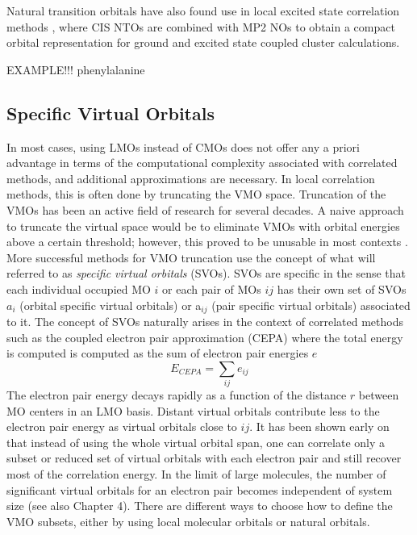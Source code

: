 Natural transition orbitals have also found use in local excited  state correlation methods \cite{Bau2017,Hof2017}, where CIS NTOs are combined with MP2 NOs to obtain a compact orbital representation for ground and excited state coupled cluster calculations.

EXAMPLE!!! phenylalanine






\subsection{Specific Virtual Orbitals}

In most cases, using LMOs instead of CMOs does not offer any a priori advantage in terms of the computational complexity associated with correlated methods, and additional approximations are necessary. In local correlation methods, this is often done by truncating the VMO space. Truncation of the VMOs has been an active field of research for several decades. A naive approach to truncate the virtual space would be to eliminate VMOs with orbital energies above a certain threshold; however, this proved to be unusable in most contexts \cite{Sen2011}. More successful methods for VMO truncation use the concept of what will referred to as \emph{specific virtual orbitals} (SVOs). SVOs are specific in the sense that each individual occupied MO $i$ or each pair of MOs $ij$ has their own set of SVOs $a_i$ (orbital specific virtual orbitals) or a$_{ij}$ (pair specific virtual orbitals) associated to it.
The concept of SVOs naturally arises in the context of correlated methods such as the coupled electron pair approximation (CEPA) where the total energy is computed is computed as the sum of electron pair energies $e$
\begin{equation}
E_{CEPA} = \sum_{ij} e_{ij}
\end{equation}
The electron pair energy decays rapidly as a function of the distance $r$ between MO centers in an LMO basis. Distant virtual orbitals contribute less to the electron pair energy as virtual orbitals close to ${ij}$. It has been shown early on that instead of using the whole virtual orbital span, one can correlate only a subset or reduced set of virtual orbitals with each electron pair \cite{Sae1985,Edm1965,Mey1971,Mey1973}
and still recover most of the correlation energy. In the limit of large molecules, the number of significant virtual orbitals for an electron pair becomes independent of system size \cite{Kra2012} (see also Chapter 4). There are different ways to choose how to define the VMO subsets, either by using local molecular orbitals or natural orbitals.

